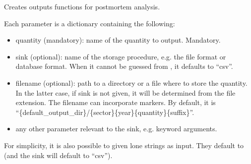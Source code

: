 \documentclass[letterpaper,10pt,english]{sphinxmanual}
\begin{document}

\begin{fulllineitems}
\label{\detokenize{api:muse.outputs.sector.factory}}
Creates outputs functions for post\sphinxhyphen{}mortem analysis.

Each parameter is a dictionary containing the following:
\begin{itemize}
\item {} 
quantity (mandatory): name of the quantity to output. Mandatory.

\item {} 
sink (optional): name of the storage procedure, e.g. the file format
or database format. When it cannot be guessed from , it defaults to
“csv”.

\item {} 
filename (optional): path to a directory or a file where to store the quantity. In
the latter case, if sink is not given, it will be determined from the file
extension. The filename can incorporate markers. By default, it is
“\{default\_output\_dir\}/\{sector\}\{year\}\{quantity\}\{suffix\}”.

\item {} 
any other parameter relevant to the sink, e.g.  keyword
arguments.

\end{itemize}

For simplicity, it is also possible to given lone strings as input.
They default to  (and the sink will default to
“csv”).

\end{fulllineitems}

\end{document}
